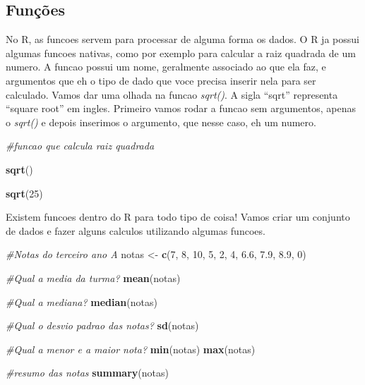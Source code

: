 \documentclass[
]{book}
\newenvironment{Shaded}{\begin{snugshade}}{\end{snugshade}}
\newcommand{\CommentTok}[1]{\textcolor[rgb]{0.56,0.35,0.01}{\textit{#1}}}
\newcommand{\DecValTok}[1]{\textcolor[rgb]{0.00,0.00,0.81}{#1}}
\newcommand{\FloatTok}[1]{\textcolor[rgb]{0.00,0.00,0.81}{#1}}
\newcommand{\FunctionTok}[1]{\textcolor[rgb]{0.13,0.29,0.53}{\textbf{#1}}}
\newcommand{\NormalTok}[1]{#1}
\newcommand{\OtherTok}[1]{\textcolor[rgb]{0.56,0.35,0.01}{#1}}
\begin{document}
\hypertarget{funuxe7uxf5es}{%
\subsection{Funções}\label{funuxe7uxf5es}}

No R, as funcoes servem para processar de alguma forma os dados. O R ja possui algumas funcoes nativas, como por exemplo para calcular a raiz quadrada de um numero. A funcao possui um nome, geralmente associado ao que ela faz, e argumentos que eh o tipo de dado que voce precisa inserir nela para ser calculado. Vamos dar uma olhada na funcao \emph{sqrt()}. A sigla ``sqrt'' representa ``square root'' em ingles. Primeiro vamos rodar a funcao sem argumentos, apenas o \emph{sqrt()} e depois inserimos o argumento, que nesse caso, eh um numero.

\begin{Shaded}
\begin{Highlighting}[]
\CommentTok{\#funcao que calcula raiz quadrada}

\FunctionTok{sqrt}\NormalTok{()}

\FunctionTok{sqrt}\NormalTok{(}\DecValTok{25}\NormalTok{)}
\end{Highlighting}
\end{Shaded}

Existem funcoes dentro do R para todo tipo de coisa! Vamos criar um conjunto de dados e fazer alguns calculos utilizando algumas funcoes.

\begin{Shaded}
\begin{Highlighting}[]
\CommentTok{\#Notas do terceiro ano A}
\NormalTok{notas }\OtherTok{\textless{}{-}} \FunctionTok{c}\NormalTok{(}\DecValTok{7}\NormalTok{, }\DecValTok{8}\NormalTok{, }\DecValTok{10}\NormalTok{, }\DecValTok{5}\NormalTok{, }\DecValTok{2}\NormalTok{, }\DecValTok{4}\NormalTok{, }\FloatTok{6.6}\NormalTok{, }\FloatTok{7.9}\NormalTok{, }\FloatTok{8.9}\NormalTok{, }\DecValTok{0}\NormalTok{)}

\CommentTok{\#Qual a media da turma?}
\FunctionTok{mean}\NormalTok{(notas)}

\CommentTok{\#Qual a mediana?}
\FunctionTok{median}\NormalTok{(notas)}

\CommentTok{\#Qual o desvio padrao das notas?}
\FunctionTok{sd}\NormalTok{(notas)}

\CommentTok{\#Qual a menor e a maior nota?}
\FunctionTok{min}\NormalTok{(notas)}
\FunctionTok{max}\NormalTok{(notas)}

\CommentTok{\#resumo das notas}
\FunctionTok{summary}\NormalTok{(notas)}
\end{Highlighting}
\end{Shaded}
\end{document}
